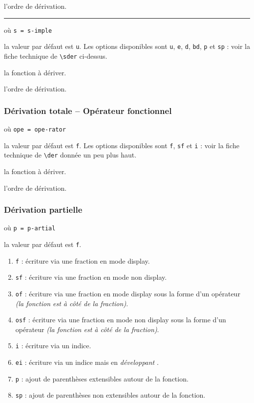 \documentclass[12pt,a4paper]{article}
\newcommand\env[1]{\texttt{#1}}
\newcommand\macro[1]{\env{\textbackslash{}#1}}
\theoremstyle{definition}
\newcommand\separation{
	\medskip
	\hfill\rule{0.5\textwidth}{0.75pt}\hfill
	\medskip
}
\newcommand\mwhyprefix[2]{%
	\texttt{#1 = #1-#2}%
}
\begin{document}
 l'ordre de dérivation.


\separation


 où \quad \mwhyprefix{s}{imple}

\IDoption{} la valeur par défaut est \verb+u+. Les options disponibles sont \verb+u+, \verb+e+, \verb+d+, \verb+bd+, \verb+p+ et \verb+sp+ : voir la fiche technique de \macro{sder} ci-dessus.

 la fonction à dériver.

 l'ordre de dérivation.




\subsubsection{Dérivation totale -- Opérateur fonctionnel}

 où \quad \mwhyprefix{ope}{rator}

\IDoption{} la valeur par défaut est \verb+f+. Les options disponibles sont \verb+f+, \verb+sf+ et \verb+i+ : voir la fiche technique de \macro{der} donnée un peu plus haut.

 la fonction à dériver.

 l'ordre de dérivation.
\subsubsection{Dérivation partielle}

 où \quad \mwhyprefix{p}{artial}

\IDoption{} la valeur par défaut est \verb+f+. 
\begin{enumerate}
	\item \verb+f+ : écriture via une fraction en mode display.

	\item \verb+sf+ : écriture via une fraction en mode non display.

	\item \verb+of+ : écriture via une fraction en mode display sous la forme d'un opérateur \emph{(la fonction est à côté de la fraction)}.

	\item \verb+osf+ : écriture via une fraction en mode non display sous la forme d'un opérateur \emph{(la fonction est à côté de la fraction)}.

	\medskip

	\item \verb+i+ : écriture via un indice.

	\item \verb+ei+ : écriture via un indice mais en \emph{\og développant \fg}.

	\medskip

	\item \verb+p+ : ajout de parenthèses extensibles autour de la fonction.

	\item \verb+sp+ : ajout de parenthèses non extensibles autour de la fonction.
\end{enumerate}
\end{document}
